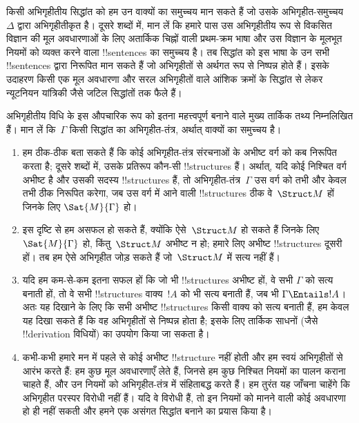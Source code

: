 \documentclass[../../../include/open-logic-section]{subfiles}
\begin{document}
\begin{explain}
किसी अभिगृहीतीय सिद्धांत को हम उन वाक्यों का समुच्चय मान सकते हैं जो
उसके अभिगृहीत-समुच्चय~$\Delta$ द्वारा अभिगृहीतीकृत है। दूसरे शब्दों में, मान लें
कि हमारे पास उस अभिगृहीतीय रूप से विकसित विज्ञान की मूल अवधारणाओं के लिए
अतार्किक चिह्नों वाली प्रथम-क्रम भाषा और उस विज्ञान के मूलभूत नियमों को व्यक्त
करने वाला !!{sentence}s का समुच्चय है। तब सिद्धांत को इस भाषा के उन सभी
!!{sentence}s द्वारा निरूपित मान सकते हैं जो अभिगृहीतों से अर्थगत रूप से
निष्पन्न होते हैं। इसके उदाहरण किसी एक मूल अवधारणा और सरल अभिगृहीतों वाले
आंशिक क्रमों के सिद्धांत से लेकर न्यूटनियन यांत्रिकी जैसे जटिल सिद्धांतों तक
फैले हैं।

अभिगृहीतीय विधि के इस औपचारिक रूप को इतना महत्त्वपूर्ण बनाने वाले मुख्य
तार्किक तथ्य निम्नलिखित हैं। मान लें कि~$\Gamma$ किसी सिद्धांत का
अभिगृहीत-तंत्र, अर्थात् वाक्यों का समुच्चय है।
\begin{enumerate}
\item हम ठीक-ठीक बता सकते हैं कि कोई अभिगृहीत-तंत्र संरचनाओं के अभीष्ट वर्ग को
  कब निरूपित करता है; दूसरे शब्दों में, उसके प्रतिरूप कौन-सी !!{structure}s
  हैं। अर्थात्, यदि कोई निश्चित वर्ग अभीष्ट है और उसकी सदस्य !!{structure}s
  हैं, तो अभिगृहीत-तंत्र~$\Gamma$ उस वर्ग को तभी और केवल तभी ठीक निरूपित करेगा,
  जब उस वर्ग में आने वाली !!{structure}s ठीक वे~$\Struct M$ हों जिनके लिए
  $\Sat{M}{\Gamma}$ हो।
\item इस दृष्टि से हम असफल हो सकते हैं, क्योंकि ऐसे~$\Struct M$ हो सकते हैं
  जिनके लिए $\Sat{M}{\Gamma}$ हो, किंतु~$\Struct M$ अभीष्ट न हो; हमारे लिए
  अभीष्ट !!{structure}s दूसरी हों। तब हम ऐसे अभिगृहीत जोड़ सकते हैं जो~$\Struct M$
  में सत्य नहीं हैं।
\item यदि हम कम-से-कम इतना सफल हों कि जो भी !!{structure}s अभीष्ट हों, वे सभी
  $\Gamma$ को सत्य बनाती हों, तो वे सभी !!{structure}s वाक्य~$!A$ को भी सत्य
  बनाती हैं, जब भी $\Gamma \Entails !A$। अतः यह दिखाने के लिए कि सभी अभीष्ट
  !!{structure}s किसी वाक्य को सत्य बनाती हैं, हम केवल यह दिखा सकते हैं कि वह
  अभिगृहीतों से निष्पन्न होता है; इसके लिए तार्किक साधनों (जैसे
  !!{derivation} विधियों) का उपयोग किया जा सकता है।
\item कभी-कभी हमारे मन में पहले से कोई अभीष्ट !!{structure} नहीं होती और हम
  स्वयं अभिगृहीतों से आरंभ करते हैं: हम कुछ मूल अवधारणाएँ लेते हैं, जिनसे हम
  कुछ निश्चित नियमों का पालन कराना चाहते हैं, और उन नियमों को अभिगृहीत-तंत्र
  में संहिताबद्ध करते हैं। हम तुरंत यह जाँचना चाहेंगे कि अभिगृहीत परस्पर
  विरोधी नहीं हैं। यदि वे विरोधी हैं, तो इन नियमों को मानने वाली कोई अवधारणा
  हो ही नहीं सकती और हमने एक असंगत सिद्धांत बनाने का प्रयास किया है।

\end{enumerate}
\end{explain}
\end{document}
